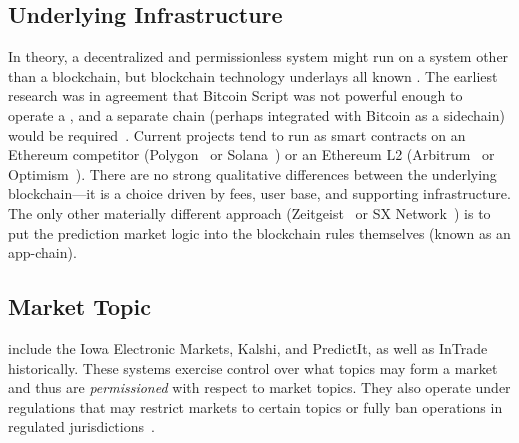 
\subsection{Underlying Infrastructure}
\label{subsec:blockchain_infra}\label{wf:chain}

In theory, a decentralized and permissionless system might run on a system other than a blockchain, but blockchain technology underlays all known \depms. The earliest research was in agreement that Bitcoin Script was not powerful enough to operate a \depm, and a separate chain (perhaps integrated with Bitcoin as a sidechain) would be required~\cite{Sz14,BCFKMN14}. Current projects tend to run as smart contracts on an Ethereum competitor (\eg Polygon~\cite{AKN21} or Solana~\cite{Yak18}) or an Ethereum L2 (\eg Arbitrum~\cite{KGCWF18} or Optimism~\cite{op}). There are no strong qualitative differences between the underlying blockchain---it is a choice driven by fees, user base, and supporting infrastructure. The only other materially different approach (\eg Zeitgeist~\cite{zeit} or SX Network~\cite{sx}) is to put the prediction market logic into the blockchain rules themselves (known as an app-chain). 




\subsection{Market Topic}\label{wf:topic}

\cepms include the Iowa Electronic Markets, Kalshi, and PredictIt, as well as InTrade historically. These systems exercise control over what topics may form a market and thus are \textit{permissioned} with respect to market topics. They also operate under regulations that may restrict markets to certain topics or fully ban operations in regulated jurisdictions~\cite{Du19}. 

